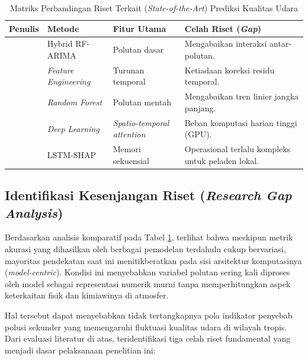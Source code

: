 \begin{table}[htbp]
\centering
\captionsetup{justification=centering}
\setlength{\tabcolsep}{5pt} 
\caption{Matriks Perbandingan Riset Terkait (\textit{State-of-the-Art}) Prediksi Kualitas Udara}
\label{tbl:matriks_sota}

\begin{tabularx}{\textwidth}{|>{\raggedright\arraybackslash}p{3.2cm}|
                              >{\raggedright\arraybackslash}p{2.2cm}|
                              >{\raggedright\arraybackslash}X|
                              >{\raggedright\arraybackslash}X|}
\hline
\textbf{Penulis} & \textbf{Metode} & \textbf{Fitur Utama} & \textbf{Celah Riset (\textit{Gap})} \\
\hline
\textcite{yenkikar2025explainable} & Hybrid RF-ARIMA & Polutan dasar & Mengabaikan interaksi antar-polutan. \\
\hline
\textcite{naz2024two} & \textit{Feature Engineering} & Turunan temporal & Ketiadaan koreksi residu temporal. \\
\hline
\textcite{alarsy2025pm25} & \textit{Random Forest} & Polutan mentah & Mengabaikan tren linier jangka panjang. \\
\hline
\textcite{chen2025hybrid} & \textit{Deep Learning} & \textit{Spatio-temporal attention} & Beban komputasi harian tinggi (GPU). \\
\hline
\textcite{radjabaycolle2025improving} & LSTM-SHAP & Memori sekuensial & Operasional terlalu kompleks untuk peladen lokal. \\
\hline
\end{tabularx}
\end{table}

\subsection{Identifikasi Kesenjangan Riset (\textit{Research Gap Analysis})}

Berdasarkan analisis komparatif pada Tabel \ref{tbl:matriks_sota}, terlihat bahwa meskipun metrik akurasi yang dihasilkan oleh berbagai pemodelan terdahulu cukup bervariasi, mayoritas pendekatan saat ini menitikberatkan pada sisi arsitektur komputasinya (\textit{model-centric}). Kondisi ini menyebabkan variabel polutan sering kali diproses oleh model sebagai representasi numerik murni tanpa memperhitungkan aspek keterkaitan fisik dan kimiawinya di atmosfer.

Hal tersebut dapat menyebabkan tidak tertangkapnya pola indikator penyebab polusi sekunder yang memengaruhi fluktuasi kualitas udara di wilayah tropis. Dari evaluasi literatur di atas, teridentifikasi tiga celah riset fundamental yang menjadi dasar pelaksanaan penelitian ini:


